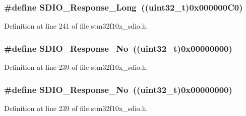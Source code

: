 \subsubsection[{\texorpdfstring{S\+D\+I\+O\+\_\+\+Response\+\_\+\+Long}{SDIO_Response_Long}}]{\setlength{\rightskip}{0pt plus 5cm}\#define S\+D\+I\+O\+\_\+\+Response\+\_\+\+Long~(({\bf uint32\+\_\+t})0x000000\+C0)}\hypertarget{group___s_d_i_o___response___type_ga1a11a8750612b344214f846784046bb0}{}\label{group___s_d_i_o___response___type_ga1a11a8750612b344214f846784046bb0}


Definition at line 241 of file stm32f10x\+\_\+sdio.\+h.

\subsubsection[{\texorpdfstring{S\+D\+I\+O\+\_\+\+Response\+\_\+\+No}{SDIO_Response_No}}]{\setlength{\rightskip}{0pt plus 5cm}\#define S\+D\+I\+O\+\_\+\+Response\+\_\+\+No~(({\bf uint32\+\_\+t})0x00000000)}\hypertarget{group___s_d_i_o___response___type_ga308b8ef0e79ba451644dda923bb3ac41}{}\label{group___s_d_i_o___response___type_ga308b8ef0e79ba451644dda923bb3ac41}


Definition at line 239 of file stm32f10x\+\_\+sdio.\+h.

\subsubsection[{\texorpdfstring{S\+D\+I\+O\+\_\+\+Response\+\_\+\+No}{SDIO_Response_No}}]{\setlength{\rightskip}{0pt plus 5cm}\#define S\+D\+I\+O\+\_\+\+Response\+\_\+\+No~(({\bf uint32\+\_\+t})0x00000000)}\hypertarget{group___s_d_i_o___response___type_ga308b8ef0e79ba451644dda923bb3ac41}{}\label{group___s_d_i_o___response___type_ga308b8ef0e79ba451644dda923bb3ac41}


Definition at line 239 of file stm32f10x\+\_\+sdio.\+h.

